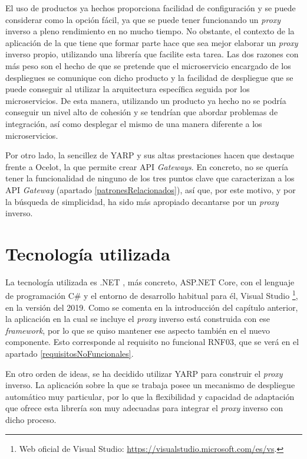 \documentclass[11pt,spanish,listoffigures]{tfgetsinf}
\begin{document}
El uso de productos ya hechos proporciona facilidad de configuración y se puede considerar como la opción fácil, ya que se puede tener funcionando un \emph{proxy} inverso a pleno rendimiento en no mucho tiempo. No obstante, el contexto de la aplicación de la que tiene que formar parte hace que sea mejor elaborar un \emph{proxy} inverso propio, utilizando una librería que facilite esta tarea. Las dos razones con más peso son el hecho de que se pretende que el microservicio encargado de los despliegues se comunique con dicho producto y la facilidad de despliegue que se puede conseguir al utilizar la arquitectura específica seguida por los microservicios. De esta manera, utilizando un producto ya hecho no se podría conseguir un nivel alto de cohesión y se tendrían que abordar problemas de integración, así como desplegar el mismo de una manera diferente a los microservicios.

Por otro lado, la sencillez de YARP y sus altas prestaciones hacen que destaque frente a Ocelot, la que permite crear API \emph{Gateways}. En concreto, no se quería tener la funcionalidad de ninguno de los tres puntos clave que caracterizan a los API \emph{Gateway} (apartado \ref{patronesRelacionados}), así que, por este motivo, y por la búsqueda de simplicidad, ha sido más apropiado decantarse por un \emph{proxy} inverso.


\chapter{Tecnología utilizada} \label{tecnologiaUtilizada}

La tecnología utilizada es .NET \cite{DotNet}, más concreto, ASP.NET Core, con el lenguaje de programación C\# \cite{Csharp} y el entorno de desarrollo habitual para él, Visual Studio \footnote{Web oficial de Visual Studio: \url{https://visualstudio.microsoft.com/es/vs}.}, en la versión del 2019. Como se comenta en la introducción del capítulo anterior, la aplicación en la cual se incluye el \emph{proxy} inverso está construida con ese \emph{framework}, por lo que se quiso mantener ese aspecto también en el nuevo componente. Esto corresponde al requisito no funcional RNF03, que se verá en el apartado \ref{requisitosNoFuncionales}.

En otro orden de ideas, se ha decidido utilizar YARP para construir el \emph{proxy} inverso. La aplicación sobre la que se trabaja posee un mecanismo de despliegue automático muy particular, por lo que la flexibilidad y capacidad de adaptación que ofrece esta librería son muy adecuadas para integrar el \emph{proxy} inverso con dicho proceso.
\end{document}
